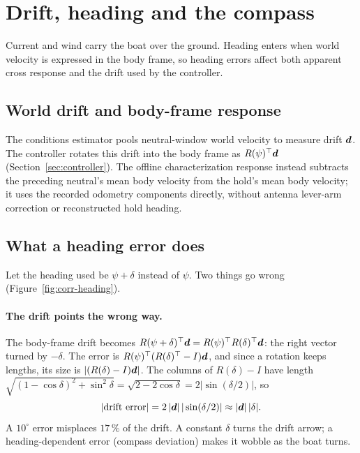 \section{Drift, heading and the compass}
\label{sec:corr-heading}

Current and wind carry the boat over the ground. Heading enters when world
velocity is expressed in the body frame, so heading errors affect both apparent
cross response and the drift used by the controller.

\subsection{World drift and body-frame response}

The conditions estimator pools neutral-window world velocity to measure drift
$\bm d$. The controller rotates this drift into the body frame as
$R(\psi)^\top\bm d$ (Section~\ref{sec:controller}). The offline characterization
response instead subtracts the preceding neutral's mean body velocity from the
hold's mean body velocity; it uses the recorded odometry components directly,
without antenna lever-arm correction or reconstructed hold heading.

\subsection{What a heading error does}

Let the heading used be $\psi + \delta$ instead of $\psi$. Two things go wrong
(Figure~\ref{fig:corr-heading}).

\paragraph{The drift points the wrong way.} The body-frame drift becomes
$R(\psi+\delta)^\top\bm d = R(\psi)^\top R(\delta)^\top\bm d$: the right vector turned
by $-\delta$. The error is $R(\psi)^\top(R(\delta)^\top - I)\bm d$, and since a
rotation keeps lengths, its size is $|(R(\delta) - I)\bm d|$. The columns of
$R(\delta) - I$ have length $\sqrt{(1-\cos\delta)^2 + \sin^2\delta} =
\sqrt{2 - 2\cos\delta} = 2|\sin(\delta/2)|$, so
\[
  |\text{drift error}| = 2\,|\bm d|\,|\sin(\delta/2)| \approx |\bm d|\,|\delta| .
\]
A $10^\circ$ error misplaces $17\,\%$ of the drift. A constant $\delta$ turns the
drift arrow; a heading-dependent error (compass deviation) makes it wobble as the
boat turns.

